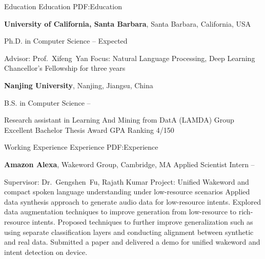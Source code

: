 \documentclass[letterpaper,MMMyyyy,nonstopmode]{simpleresumecv}
\begin{document}
\begin{Body}

\Section
{Education}
{Education}
{PDF:Education}

\Entry
\textbf{University of California, Santa Barbara},
Santa Barbara, California, USA

\Gap
\BulletItem
Ph.D. in Computer Science
\hfill
{} --  Expected
\begin{Detail}
\SubBulletItem
Advisor:
Prof.~Xifeng~Yan
\SubBulletItem
Focus:
Natural Language Processing, Deep Learning
\SubBulletItem
Chancellor's Fellowship for three years
\end{Detail}

\BigGap
\Entry
\textbf{Nanjing University},
Nanjing, Jiangsu, China

\Gap
\BulletItem
B.S. in Computer Science
\hfill
{} --
\begin{Detail}
\SubBulletItem
Research assistant in Learning And Mining from DatA (LAMDA) Group
\SubBulletItem
Excellent Bachelor Thesis Award
\SubBulletItem
GPA Ranking 4/150

\end{Detail}


\Section
{Working Experience}
{Experience}
{PDF:Experience}

\BigGap
\Entry
\textbf{Amazon Alexa},
Wakeword Group, Cambridge, MA
\BulletItem
Applied Scientist Intern
\hfill
{} --
\begin{Detail}
\SubBulletItem
Supervisor:
Dr.~Gengshen~Fu, Rajath Kumar
\SubBulletItem
Project: Unified Wakeword and compact spoken language understanding under low-resource scenarios
\SubBulletItem
Applied data synthesis approach to generate audio data for low-resource intents.
\SubBulletItem
Explored data augmentation techniques to improve generation from low-resource to rich-resource intents.
\SubBulletItem
Proposed techniques to further improve generalization such as using separate classification layers and conducting alignment between synthetic and real data.
\SubBulletItem
Submitted a paper and delivered a demo for unified wakeword and intent detection on device.

\end{Detail}


\end{Body}
\end{document}
